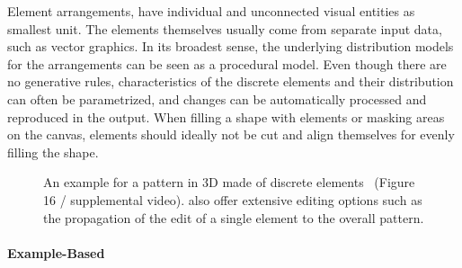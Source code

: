Element arrangements,  have individual and unconnected visual entities as smallest unit. The elements themselves usually come from separate input data, such as vector graphics. In its broadest sense, the underlying distribution models for the arrangements can be seen as a procedural model. Even though there are no generative rules, characteristics of the discrete elements and their distribution can often be parametrized, and changes can be automatically processed and reproduced in the output. When filling a shape with elements or masking areas on the canvas, elements should ideally not be cut and align themselves for evenly filling the shape.

\begin{figure}[H]
    \centering
    \caption{\label{fig:ma_2011_det}An example for a pattern in 3D made of discrete elements~\cite{ma_2011_det} (Figure 16 / supplemental video). \citeauthor*{ma_2011_det} also offer extensive editing options such as the propagation of the edit of a single element to the overall pattern. \color{orange}{Status rights: requested}}
\end{figure}

\paragraph*{Example-Based}
\label{para:analysis_element_arrangements_example}


